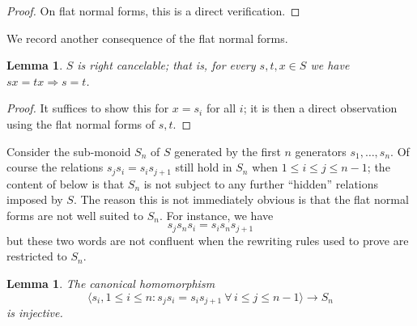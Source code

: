 \documentclass[12pt, pdflatex]{amsart}
\newtheorem{lemma}[theorem]{Lemma}
\theoremstyle{definition}
\numberwithin{equation}{section}
\numberwithin{theorem}{section}
\begin{document}
\begin{proof}
On flat normal forms, this is a direct verification.
\end{proof}

We record another consequence of the flat normal forms.

\begin{lemma}\label{lem:right-cancel}
$S$ is right cancelable; that is, for every $s, t, x\in S$ we have $sx=tx \Rightarrow s=t$.
\end{lemma}

\begin{proof}
It suffices to show this for $x=s_i$ for all $i$; it is then a direct observation using the flat normal forms of $s, t$.
\end{proof}

Consider the sub-monoid $S_n$ of $S$ generated by the first $n$ generators $s_1, \ldots , s_n$. Of course the relations $s_j s_i = s_i s_{j+1}$ still hold in $S_n$ when $1\leq i \leq j \leq n-1$; the content of  below is that $S_n$ is not subject to any further ``hidden'' relations imposed by $S$. The reason this is not immediately obvious is that the flat normal forms are not well suited to $S_n$. For instance, we have
\begin{equation*}
s_j s_n s_i = s_i s_n s_{j+1}
\end{equation*}
but these two words are not confluent when the rewriting rules used to prove  are restricted to $S_n$.

\begin{lemma}\label{lem:monoid-inj}
The canonical homomorphism
\begin{equation*}
\big\langle s_i, 1\leq i \leq n : s_j s_i = s_i s_{j+1} \ \forall\,  i \leq j \leq n-1 \big\rangle \longrightarrow S_n
\end{equation*}
is injective.
\end{lemma}
\end{document}
